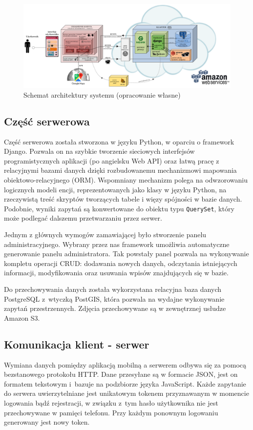 \documentclass[licencjacka]{pracamgr}
\begin{document}
\newpage
\begin{figure}[H]
  \centering
  \includegraphics[angle=90, width=\textwidth,height=\textheight, keepaspectratio]{architekturakolor.png}
  \caption{Schemat architektury systemu (opracowanie własne)}
\end{figure}

\subsection{Część serwerowa}

Część serwerowa została stworzona w języku Python, w oparciu o framework Django. Pozwala on na szybkie tworzenie sieciowych interfejsów programistycznych aplikacji (po angielsku Web API) oraz łatwą pracę z relacyjnymi bazami danych dzięki rozbudowanemu mechanizmowi mapowania obiektowo-relacyjnego (ORM). Wspomniany mechanizm polega na odwzorowaniu logicznych modeli encji, reprezentowanych jako klasy w języku Python, na rzeczywistą treść skryptów tworzących tabele i więzy spójności w bazie danych. Podobnie, wyniki zapytań są konwertowane do obiektu typu \texttt{QuerySet}, który może podlegać dalszemu przetwarzaniu przez serwer.

Jednym z głównych wymogów zamawiającej było stworzenie panelu administracyjnego. Wybrany przez nas framework umożliwia automatyczne generowanie panelu administratora. Tak powstały panel pozwala na wykonywanie kompletu operacji CRUD: dodawania nowych danych, odczytania istniejących informacji, modyfikowania oraz usuwania wpisów znajdujących się w bazie.

Do przechowywania danych została wykorzystana relacyjna baza danych PostgreSQL z~wtyczką PostGIS, która pozwala na wydajne wykonywanie zapytań przestrzennych. Zdjęcia przechowywane są w zewnętrznej usłudze Amazon S3.

\subsection{Komunikacja klient - serwer}
Wymiana danych pomiędzy aplikacją mobilną a serwerem odbywa się za pomocą bezstanowego protokołu HTTP. Dane przesyłane są w formacie JSON, jest on formatem tekstowym i~bazuje na podzbiorze języka JavaScript. Każde zapytanie do serwera uwierzytelniane jest unikatowym tokenem przyznawanym w momencie logowania bądź rejestracji, w związku z~tym hasło użytkownika nie jest przechowywane w pamięci telefonu. Przy każdym ponownym logowaniu generowany jest nowy token.
\end{document}
